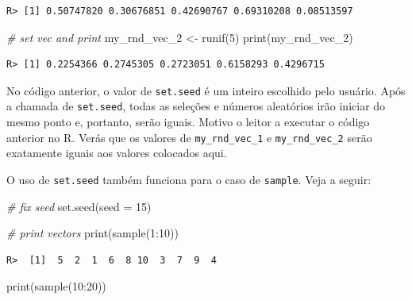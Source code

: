 \documentclass[
  11pt,
]{book}
\newenvironment{Shaded}{\begin{snugshade}}{\end{snugshade}}
\newcommand{\AttributeTok}[1]{\textcolor[rgb]{0.61,0.61,0.61}{#1}}
\newcommand{\CommentTok}[1]{\textcolor[rgb]{0.37,0.37,0.37}{\textit{#1}}}
\newcommand{\DecValTok}[1]{\textcolor[rgb]{0.06,0.06,0.06}{#1}}
\newcommand{\FunctionTok}[1]{\textcolor[rgb]{0,0,0}{#1}}
\newcommand{\NormalTok}[1]{#1}
\newcommand{\OtherTok}[1]{\textcolor[rgb]{0.37,0.37,0.37}{#1}}
\newcommand{\SpecialCharTok}[1]{\textcolor[rgb]{0,0,0}{#1}}
\begin{document}
\begin{verbatim}
R> [1] 0.50747820 0.30676851 0.42690767 0.69310208 0.08513597
\end{verbatim}

\begin{Shaded}
\begin{Highlighting}[]
\CommentTok{\# set vec and print}
\NormalTok{my\_rnd\_vec\_2 }\OtherTok{\textless{}{-}} \FunctionTok{runif}\NormalTok{(}\DecValTok{5}\NormalTok{)}
\FunctionTok{print}\NormalTok{(my\_rnd\_vec\_2)}
\end{Highlighting}
\end{Shaded}

\begin{verbatim}
R> [1] 0.2254366 0.2745305 0.2723051 0.6158293 0.4296715
\end{verbatim}

No código anterior, o valor de \texttt{set.seed} é um inteiro escolhido pelo usuário. Após a chamada de \texttt{set.seed}, todas as seleções e números aleatórios irão iniciar do mesmo ponto e, portanto, serão iguais. Motivo o leitor a executar o código anterior no R. Verás que os valores de \texttt{my\_rnd\_vec\_1} e \texttt{my\_rnd\_vec\_2} serão exatamente iguais aos valores colocados aqui.

O uso de \texttt{set.seed} também funciona para o caso de \texttt{sample}. Veja a seguir:

\begin{Shaded}
\begin{Highlighting}[]
\CommentTok{\# fix seed}
\FunctionTok{set.seed}\NormalTok{(}\AttributeTok{seed =} \DecValTok{15}\NormalTok{)}

\CommentTok{\# print vectors}
\FunctionTok{print}\NormalTok{(}\FunctionTok{sample}\NormalTok{(}\DecValTok{1}\SpecialCharTok{:}\DecValTok{10}\NormalTok{))}
\end{Highlighting}
\end{Shaded}

\begin{verbatim}
R>  [1]  5  2  1  6  8 10  3  7  9  4
\end{verbatim}

\begin{Shaded}
\begin{Highlighting}[]
\FunctionTok{print}\NormalTok{(}\FunctionTok{sample}\NormalTok{(}\DecValTok{10}\SpecialCharTok{:}\DecValTok{20}\NormalTok{))}
\end{Highlighting}
\end{Shaded}
\end{document}
